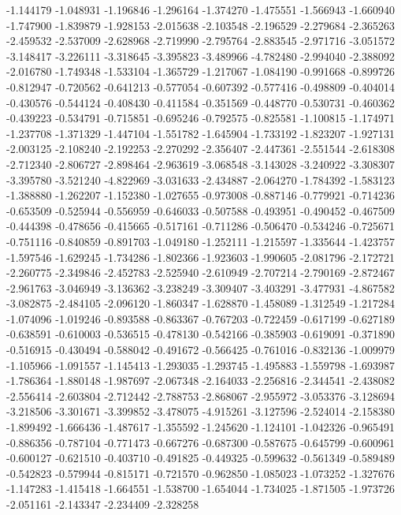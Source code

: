 -1.144179
-1.048931
-1.196846
-1.296164
-1.374270
-1.475551
-1.566943
-1.660940
-1.747900
-1.839879
-1.928153
-2.015638
-2.103548
-2.196529
-2.279684
-2.365263
-2.459532
-2.537009
-2.628968
-2.719990
-2.795764
-2.883545
-2.971716
-3.051572
-3.148417
-3.226111
-3.318645
-3.395823
-3.489966
-4.782480
-2.994040
-2.388092
-2.016780
-1.749348
-1.533104
-1.365729
-1.217067
-1.084190
-0.991668
-0.899726
-0.812947
-0.720562
-0.641213
-0.577054
-0.607392
-0.577416
-0.498809
-0.404014
-0.430576
-0.544124
-0.408430
-0.411584
-0.351569
-0.448770
-0.530731
-0.460362
-0.439223
-0.534791
-0.715851
-0.695246
-0.792575
-0.825581
-1.100815
-1.174971
-1.237708
-1.371329
-1.447104
-1.551782
-1.645904
-1.733192
-1.823207
-1.927131
-2.003125
-2.108240
-2.192253
-2.270292
-2.356407
-2.447361
-2.551544
-2.618308
-2.712340
-2.806727
-2.898464
-2.963619
-3.068548
-3.143028
-3.240922
-3.308307
-3.395780
-3.521240
-4.822969
-3.031633
-2.434887
-2.064270
-1.784392
-1.583123
-1.388880
-1.262207
-1.152380
-1.027655
-0.973008
-0.887146
-0.779921
-0.714236
-0.653509
-0.525944
-0.556959
-0.646033
-0.507588
-0.493951
-0.490452
-0.467509
-0.444398
-0.478656
-0.415665
-0.517161
-0.711286
-0.506470
-0.534246
-0.725671
-0.751116
-0.840859
-0.891703
-1.049180
-1.252111
-1.215597
-1.335644
-1.423757
-1.597546
-1.629245
-1.734286
-1.802366
-1.923603
-1.990605
-2.081796
-2.172721
-2.260775
-2.349846
-2.452783
-2.525940
-2.610949
-2.707214
-2.790169
-2.872467
-2.961763
-3.046949
-3.136362
-3.238249
-3.309407
-3.403291
-3.477931
-4.867582
-3.082875
-2.484105
-2.096120
-1.860347
-1.628870
-1.458089
-1.312549
-1.217284
-1.074096
-1.019246
-0.893588
-0.863367
-0.767203
-0.722459
-0.617199
-0.627189
-0.638591
-0.610003
-0.536515
-0.478130
-0.542166
-0.385903
-0.619091
-0.371890
-0.516915
-0.430494
-0.588042
-0.491672
-0.566425
-0.761016
-0.832136
-1.009979
-1.105966
-1.091557
-1.145413
-1.293035
-1.293745
-1.495883
-1.559798
-1.693987
-1.786364
-1.880148
-1.987697
-2.067348
-2.164033
-2.256816
-2.344541
-2.438082
-2.556414
-2.603804
-2.712442
-2.788753
-2.868067
-2.955972
-3.053376
-3.128694
-3.218506
-3.301671
-3.399852
-3.478075
-4.915261
-3.127596
-2.524014
-2.158380
-1.899492
-1.666436
-1.487617
-1.355592
-1.245620
-1.124101
-1.042326
-0.965491
-0.886356
-0.787104
-0.771473
-0.667276
-0.687300
-0.587675
-0.645799
-0.600961
-0.600127
-0.621510
-0.403710
-0.491825
-0.449325
-0.599632
-0.561349
-0.589489
-0.542823
-0.579944
-0.815171
-0.721570
-0.962850
-1.085023
-1.073252
-1.327676
-1.147283
-1.415418
-1.664551
-1.538700
-1.654044
-1.734025
-1.871505
-1.973726
-2.051161
-2.143347
-2.234409
-2.328258
